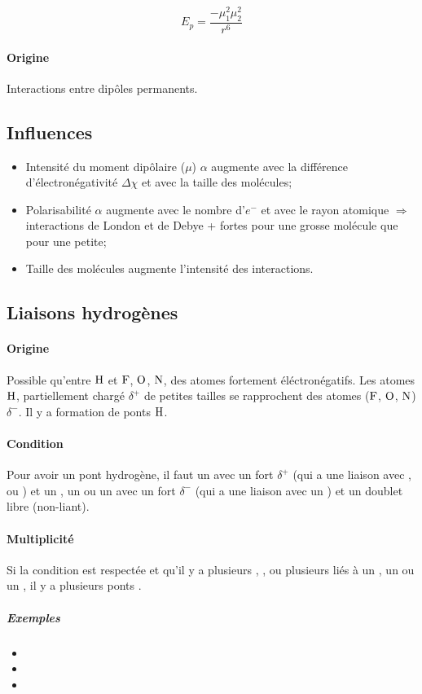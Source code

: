 \[ E_p = \frac{-\mu_1^2 \mu_2^2}{r^6} \]

\paragraph{Origine}
Interactions entre dipôles permanents.

\subsection{Influences}

\begin{itemize}
  \item Intensité du moment dipôlaire ($\mu$)
    $\alpha$ augmente avec la différence d'électronégativité $\Delta\chi$ et avec la taille des molécules;
  \item Polarisabilité
    $\alpha$ augmente avec le nombre d'$e^-$ et avec le rayon atomique
    $\Rightarrow$ interactions de London et de Debye + fortes pour une grosse molécule que pour une petite;
  \item Taille des molécules augmente l'intensité des interactions.
\end{itemize}

\subsection{Liaisons hydrogènes}
\paragraph{Origine}
Possible qu'entre $\ce{H}$ et $\ce{F}$,
$\ce{O}$, $\ce{N}$, des atomes fortement éléctronégatifs.
Les atomes $\ce{H}$,
partiellement chargé $\delta^+$ de petites tailles se rapprochent des atomes ($\ce{F}$, $\ce{O}$, $\ce{N}$) $\delta^-$.
Il y a formation de ponts $\ce{H}$.
\paragraph{Condition}
Pour avoir un pont hydrogène, il faut un  avec un fort $\delta^+$ (qui a une liaison avec ,  ou ) et un , un  ou un  avec un fort $\delta^-$ (qui a une liaison avec un ) et un doublet libre (non-liant).
\paragraph{Multiplicité}
Si la condition est respectée et qu'il y a plusieurs , ,  ou plusieurs  liés à un , un  ou un , il y a plusieurs ponts .
\subparagraph{Exemples}
\begin{itemize}
  \item {}
  \item {}
  \item {}
\end{itemize}

